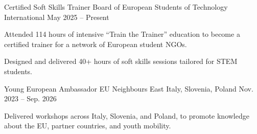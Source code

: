 \begin{cventries}
  \cventry
    {Certified Soft Skills Trainer} %
    {Board of European Students of Technology} %
    {International} %
    {May 2025 -- Present} %
    {
      \begin{cvitems} %
        \item {Attended 114 hours of intensive ``Train the Trainer'' education to become a certified trainer for a network of European student NGOs.}
        \item {Designed and delivered 40+ hours of soft skills sessions tailored for STEM students.}
      \end{cvitems}
    }

  \cventry
    {Young European Ambassador} %
    {EU Neighbours East} %
    {Italy, Slovenia, Poland} %
    {Nov. 2023 -- Sep. 2026} %
    {
      \begin{cvitems} %
        \item {Delivered workshops across Italy, Slovenia, and Poland, to promote knowledge about the EU, partner countries, and youth mobility.}
      \end{cvitems}
    }

\end{cventries}